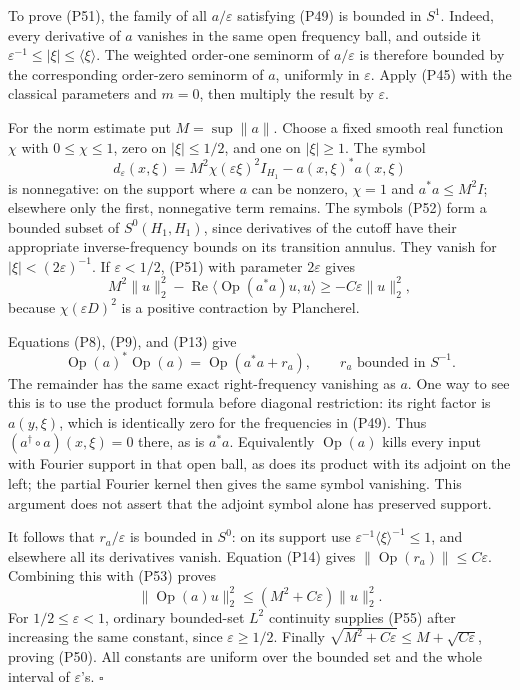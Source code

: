 \documentclass[
  11pt,
]{article}
\begin{document}
To prove (P51), the family of all \(a/\varepsilon\) satisfying (P49) is
bounded in \(S^1\). Indeed, every derivative of \(a\) vanishes in the
same open frequency ball, and outside it
\(\varepsilon^{-1}\leq|\xi|\leq\langle\xi\rangle\). The weighted
order-one seminorm of \(a/\varepsilon\) is therefore bounded by the
corresponding order-zero seminorm of \(a\), uniformly in
\(\varepsilon\). Apply (P45) with the classical parameters and \(m=0\),
then multiply the result by \(\varepsilon\).

For the norm estimate put \(M=\sup\|a\|\). Choose a fixed smooth real
function \(\chi\) with \(0\leq\chi\leq1\), zero on \(|\xi|\leq1/2\), and
one on \(|\xi|\geq1\). The symbol \[
 d_\varepsilon(x,\xi)=M^2\chi(\varepsilon\xi)^2I_{H_1}
                         -a(x,\xi)^*a(x,\xi)
\tag{P52}
\] is nonnegative: on the support where \(a\) can be nonzero, \(\chi=1\)
and \(a^*a\leq M^2I\); elsewhere only the first, nonnegative term
remains. The symbols (P52) form a bounded subset of \(S^0(H_1,H_1)\),
since derivatives of the cutoff have their appropriate inverse-frequency
bounds on its transition annulus. They vanish for
\(|\xi|<(2\varepsilon)^{-1}\). If \(\varepsilon<1/2\), (P51) with
parameter \(2\varepsilon\) gives \[
 M^2\|u\|_2^2
 -\operatorname{Re}\langle\operatorname{Op}(a^*a)u,u\rangle
 \geq-C\varepsilon\|u\|_2^2,
\tag{P53}
\] because \(\chi(\varepsilon D)^2\) is a positive contraction by
Plancherel.

Equations (P8), (P9), and (P13) give \[
 \operatorname{Op}(a)^*\operatorname{Op}(a)
 =\operatorname{Op}(a^*a+r_a),
 \qquad r_a\text{ bounded in }S^{-1}.
\tag{P54}
\] The remainder has the same exact right-frequency vanishing as \(a\).
One way to see this is to use the product formula before diagonal
restriction: its right factor is \(a(y,\xi)\), which is identically zero
for the frequencies in (P49). Thus \((a^\dagger\circ a)(x,\xi)=0\)
there, as is \(a^*a\). Equivalently \(\operatorname{Op}(a)\) kills every
input with Fourier support in that open ball, as does its product with
its adjoint on the left; the partial Fourier kernel then gives the same
symbol vanishing. This argument does not assert that the adjoint symbol
alone has preserved support.

It follows that \(r_a/\varepsilon\) is bounded in \(S^0\): on its
support use \(\varepsilon^{-1}\langle\xi\rangle^{-1}\leq1\), and
elsewhere all its derivatives vanish. Equation (P14) gives
\(\|\operatorname{Op}(r_a)\|\leq C\varepsilon\). Combining this with
(P53) proves \[
 \|\operatorname{Op}(a)u\|_2^2
 \leq(M^2+C\varepsilon)\|u\|_2^2.
\tag{P55}
\] For \(1/2\leq\varepsilon<1\), ordinary bounded-set \(L^2\) continuity
supplies (P55) after increasing the same constant, since
\(\varepsilon\geq1/2\). Finally
\(\sqrt{M^2+C\varepsilon}\leq M+\sqrt{C\varepsilon}\), proving (P50).
All constants are uniform over the bounded set and the whole interval of
\(\varepsilon\)'s. \(\square\)
\end{document}
